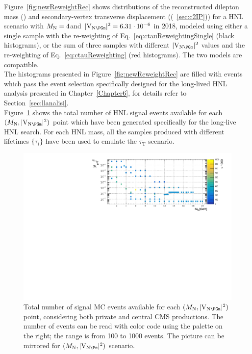 Figure~\ref{fig:newReweightRec} shows distributions of the
reconstructed dilepton mass (\mtwol) and secondary-vertex transverse
displacement (\Deltwod (~\ref{sec:c2IP})) for a HNL scenario with
$M_{\mathrm{N}}=4$\GeV and $\mixparm = 6.31\cdot 10^{-6}$ in 2018,
modeled using either a single sample with the re-weighting of
Eq.~\ref{eq:ctauReweightingSingle} (black histograms), or the sum of
three samples with different $\mixparm$ values and the re-weighting of
Eq.~\ref{eq:ctauReweighting} (red histograms). The two models are compatible.\\
The histograms
presented in Figure~\ref{fig:newReweightRec} are filled with events
which pass the event selection specifically designed for the
long-lived HNL analysis presented in Chapter~\ref{Chapter6}, for details
refer to Section~\ref{sec:llanalisi}. \\

Figure~\ref{fig:hnlSamples} shows the total number of HNL signal
events available for each $(\mhnl,\mixparm)$ point which have been
generated specifically for the long-live HNL search. For each HNL
mass, all the samples produced with different lifetimes
$\{\tau_i\}$ have been used to emulate the $\tau_{\mathrm T}$ scenario.


\begin{figure}[h!]
  \centering
  \includegraphics[clip,trim=0.7cm 0cm 0cm 0cm ,width=1\textwidth]{Figures/c4/mu.pdf}
  \caption{Total number of signal MC events available for each
    $(\mhnl,\mixparm)$ point, considering both private and central CMS
    productions. The number of events can be read with color code
    using the palette on the right; the range is from 100 to 1000 events. The picture can be mirrored for $(\mhnl,\mixpare)$ scenario.}
  \label{fig:hnlSamples}
\end{figure}



